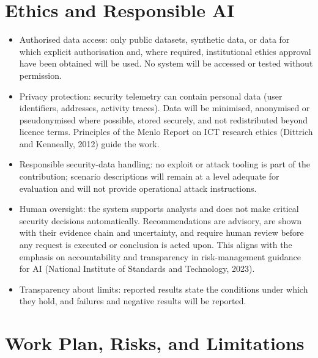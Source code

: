 \documentclass[a4paper,11pt,oneside]{article}
\begin{document}
\section{Ethics and Responsible AI}
\begin{itemize}[leftmargin=*, itemsep=2pt, topsep=3pt]
\item Authorised data access: only public datasets, synthetic data, or data for which
explicit authorisation and, where required, institutional ethics approval have been obtained will be used. No system will be accessed or tested without permission.
\item Privacy protection: security telemetry can contain personal data (user identifiers,
addresses, activity traces). Data will be minimised, anonymised or pseudonymised where possible, stored securely, and not redistributed beyond licence terms. Principles of the Menlo Report on ICT research ethics (Dittrich and Kenneally, 2012) guide the work.
\item Responsible security-data handling: no exploit or attack tooling is part of the
contribution; scenario descriptions will remain at a level adequate for evaluation and will not provide operational attack instructions.
\item Human oversight: the system supports analysts and does not make critical security
decisions automatically. Recommendations are advisory, are shown with their evidence chain and uncertainty, and require human review before any request is executed or conclusion is acted upon. This aligns with the emphasis on accountability and transparency in risk-management guidance for AI (National Institute of Standards and Technology, 2023).
\item Transparency about limits: reported results state the conditions under which
they hold, and failures and negative results will be reported.
\end{itemize}
\section{Work Plan, Risks, and Limitations}
\end{document}
